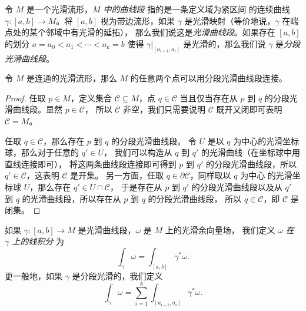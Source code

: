令 $M$ 是一个光滑流形，\emph{$M$ 中的曲线段} 指的是一条定义域为紧区间
的连续曲线 $\gamma:[a,b]\to M$。将 $[a,b]$ 视为带边流形，如果
$\gamma$ 是光滑映射（等价地说，$\gamma$ 在端点处的某个邻域中有光滑的延拓），
那么我们说这是\emph{光滑曲线段}。如果存在 $[a,b]$ 的划分 $a=a_0<a_1<\cdots<a_k=b$
使得 $\gamma|_{[a_{i-1},a_i]}$ 是光滑的，那么我们说 $\gamma$
是\emph{分段光滑曲线段}。

\begin{proposition}
  令 $M$ 是连通的光滑流形，那么 $M$ 的任意两个点可以用分段光滑曲线段连接。
\end{proposition}
\begin{proof}
  任取 $p\in M$，定义集合 $\mathcal{C}\subseteq M$，点 $q\in \mathcal{C}$
  当且仅当存在从 $p$ 到 $q$ 的分段光滑曲线段。显然 $p\in \mathcal{C}$，
  所以 $\mathcal{C}$ 非空，我们只需要说明 $\mathcal{C}$ 既开又闭即可表明
  $\mathcal{C}=M$。

  任取 $q\in \mathcal{C}$，那么存在 $p$ 到 $q$ 的分段光滑曲线段。
  令 $U$ 是以 $q$ 为中心的光滑坐标球，那么对于任意的 $q'\in U$，
  我们可以构造从 $q$ 到 $q'$ 的光滑曲线（在坐标球中用直线连接即可），
  将这两条曲线段连接即可得到 $p$ 到 $q'$ 的分段光滑曲线段，所以
  $q'\in \mathcal{C}$，这表明 $\mathcal{C}$ 是开集。
  另一方面，任取 $q\in\partial \mathcal{C}$，同样取以 $q$ 为中心
  的光滑坐标球 $U$，那么存在 $q'\in U\cap \mathcal{C}$，
  于是存在从 $p$ 到 $q'$ 的分段光滑曲线段以及从 $q'$ 到 $q$
  的光滑曲线段，所以存在从 $p$ 到 $q$ 的分段光滑曲线段，
  所以 $q\in \mathcal{C}$，即 $\mathcal{C}$ 是闭集。
\end{proof}

如果 $\gamma:[a,b]\to M$ 是光滑曲线段，$\omega$ 是 $M$ 上的光滑余向量场，
我们定义 \emph{$\omega$ 在 $\gamma$ 上的线积分} 为
\[
  \int_\gamma\omega=\int_{[a,b]}\gamma^*\omega.  
\]
更一般地，如果 $\gamma$ 是分段光滑的，我们定义
\[
    \int_\gamma\omega=\sum_{i=1}^k\int_{[a_{i-1},a_i]}\gamma^*\omega.
\]


